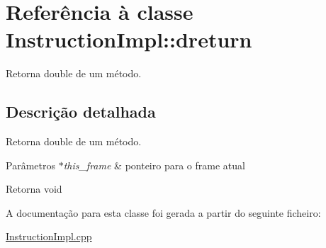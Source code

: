 \hypertarget{class_instruction_impl_1_1dreturn}{}\section{Referência à classe Instruction\+Impl\+:\+:dreturn}
\label{class_instruction_impl_1_1dreturn}


Retorna double de um método.  




\subsection{Descrição detalhada}
Retorna double de um método. 


\begin{DoxyParams}{Parâmetros}
{\em $\ast$this\+\_\+frame} & ponteiro para o frame atual \\
\hline
\end{DoxyParams}
\begin{DoxyReturn}{Retorna}
void 
\end{DoxyReturn}


A documentação para esta classe foi gerada a partir do seguinte ficheiro\+:\begin{DoxyCompactItemize}
\item 
\hyperlink{_instruction_impl_8cpp}{Instruction\+Impl.\+cpp}\end{DoxyCompactItemize}
